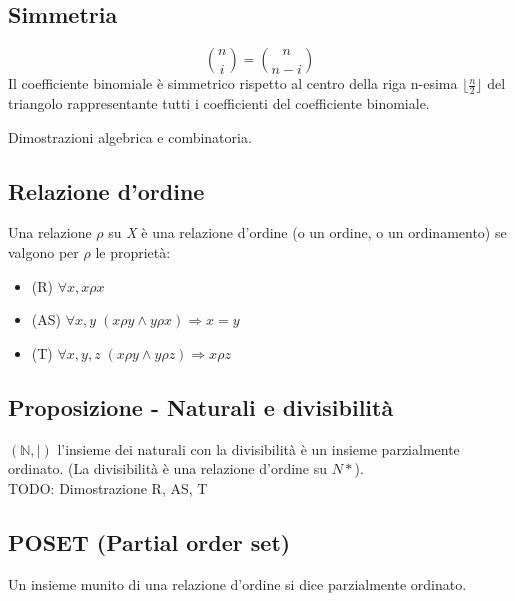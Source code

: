 \subsection{Simmetria}
\[\binom{n}{i}=\binom{n}{n-i}\]
Il coefficiente binomiale è simmetrico rispetto al centro della riga n-esima \(\lfloor\frac{n}{2}\rfloor\) del triangolo rappresentante tutti i coefficienti del coefficiente binomiale.

Dimostrazioni algebrica e combinatoria.

\subsection{Relazione d'ordine}
Una relazione \(\rho\) su \textit{X} è una relazione d'ordine (o un ordine, o un ordinamento) se valgono per \(\rho\) le proprietà:
\begin{itemize}
    \item (R) \(\forall x, x\rho x\)
    \item (AS) \(\forall x,y\; (x\rho y\land y\rho x)\Rightarrow x=y\)
    \item (T) \(\forall x,y,z\; (x\rho y\land y\rho z)\Rightarrow x\rho z\)
\end{itemize}

\subsection{Proposizione - Naturali e divisibilità}
$(\mathbb{N}, |)$ l'insieme dei naturali con la divisibilità è un insieme parzialmente ordinato. (La divisibilità è una relazione d'ordine su $N*$).
\\TODO: Dimostrazione R, AS, T

\subsection{POSET (Partial order set)}
Un insieme munito di una relazione d'ordine si dice parzialmente ordinato.
